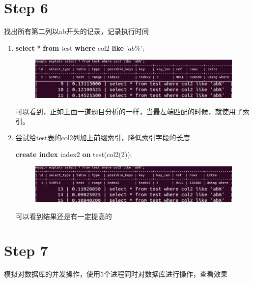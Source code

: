 \documentclass[UTF8]{ctexart}
\begin{document}
\section{Step 6}
找出所有第二列以ab开头的记录，记录执行时间
    \begin{enumerate}
        \item 
        \textbf{select }* \textbf{from }test \textbf{where }col2 \textbf{like } '$ab\% $';
        \begin{figure}[ht]
            \centering
            \includegraphics[scale=0.55]{db13.jpg}
            \label{fig:db13}
        \end{figure}
        
        可以看到，正如上面一道题目分析的一样，当最左端匹配的时候，就使用了索引。
        \item 尝试给test表的col2列加上前缀索引，降低索引字段的长度
        
        \textbf{create index} index2 \textbf{on} test(col2(2));
        \begin{figure}[ht]
            \centering
            \includegraphics[scale=0.55]{db14.jpg}
            \label{fig:db14}
        \end{figure}
        
        可以看到结果还是有一定提高的
        
        
    \end{enumerate}

\section{Step 7}
模拟对数据库的并发操作，使用5个进程同时对数据库进行操作，查看效果



\end{document}
